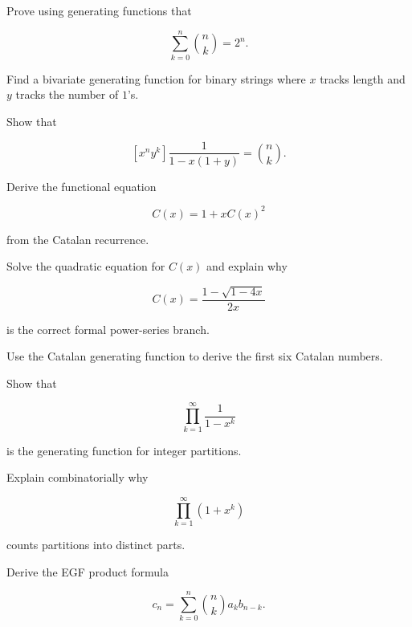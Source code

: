 \begin{exercise}[3]
Prove using generating functions that

\[
\sum_{k=0}^{n}\binom{n}{k}=2^n.
\]
\end{exercise}

\begin{exercise}[3]
Find a bivariate generating function for binary strings where \(x\)
tracks length and \(y\) tracks the number of \(1\)'s.
\end{exercise}

\begin{exercise}[3]
Show that

\[
[x^ny^k]
\frac{1}{1-x(1+y)}
=
\binom{n}{k}.
\]
\end{exercise}

\begin{exercise}[3]
Derive the functional equation

\[
C(x)=1+xC(x)^2
\]

from the Catalan recurrence.
\end{exercise}

\begin{exercise}[3]
Solve the quadratic equation for \(C(x)\) and explain why

\[
C(x)
=
\frac{1-\sqrt{1-4x}}{2x}
\]

is the correct formal power-series branch.
\end{exercise}

\begin{exercise}[3]
Use the Catalan generating function to derive the first six Catalan
numbers.
\end{exercise}

\begin{exercise}[3]
Show that

\[
\prod_{k=1}^{\infty}
\frac{1}{1-x^k}
\]

is the generating function for integer partitions.
\end{exercise}

\begin{exercise}[3]
Explain combinatorially why

\[
\prod_{k=1}^{\infty}
(1+x^k)
\]

counts partitions into distinct parts.
\end{exercise}

\begin{exercise}[3]
Derive the EGF product formula

\[
c_n
=
\sum_{k=0}^{n}
\binom{n}{k}a_kb_{n-k}.
\]
\end{exercise}

